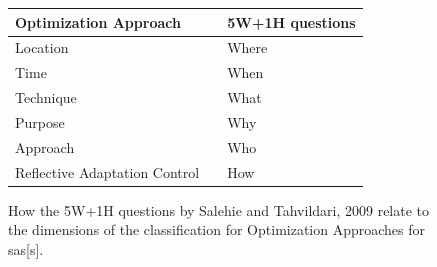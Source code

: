 \begin{figure}[h]
    \centering
    \begin{tabular}{|lcl|}
        \hline
        Optimization Approach & & 5W+1H questions \\
        \hline
        Location & & Where \\
        \hline
        Time & & When \\
        \hline
        Technique & & What \\
        \hline
        Purpose & & Why \\
        \hline
        Approach & & Who \\
        \hline
        Reflective Adaptation Control & & How \\
        \hline
    \end{tabular}
    \caption{How the 5W+1H questions by Salehie and Tahvildari, 2009 \cite*{LandscapeAndResearchChallenges}
    relate to the dimensions of the classification for Optimization Approaches for \acrlong{sas}[s].}
    \label{fig:QuestionsOA}
\end{figure}
